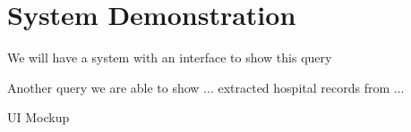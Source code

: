 
\section{System Demonstration}

We will have a system with an interface to show this query

Another query we are able to show ... extracted hospital records from ...


UI Mockup


